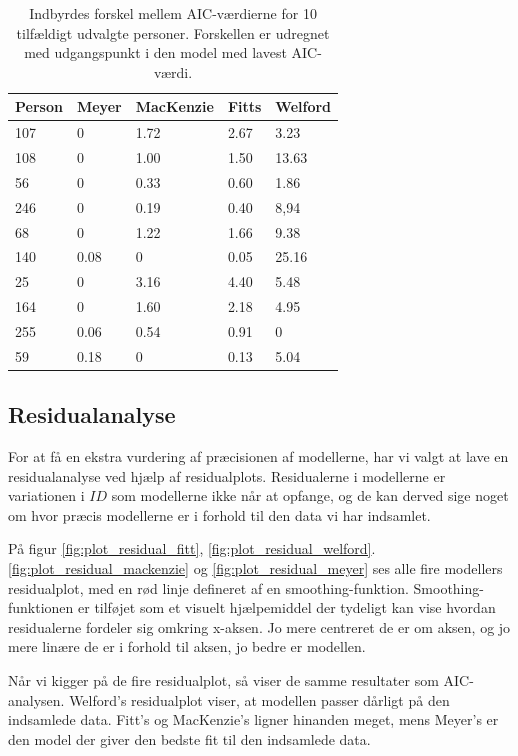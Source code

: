 \begin{table}[h]
\centering
\begin{tabular}{lllll}
Person & Meyer  & MacKenzie & Fitts  & Welford \\\hline
107    & 0      & 1.72      & 2.67   & 3.23    \\
108    & 0      & 1.00      & 1.50   & 13.63   \\
56     & 0      & 0.33      & 0.60   & 1.86    \\
246    & 0      & 0.19      & 0.40   & 8,94    \\
68     & 0      & 1.22      & 1.66   & 9.38    \\
140    & 0.08   & 0         & 0.05   & 25.16   \\
25     & 0      & 3.16      & 4.40   & 5.48    \\
164    & 0      & 1.60      & 2.18   & 4.95    \\
255    & 0.06   & 0.54      & 0.91   & 0       \\
59     & 0.18   & 0         & 0.13   & 5.04
\end{tabular}
\caption{Indbyrdes forskel mellem AIC-værdierne for 10 tilfældigt udvalgte personer. Forskellen er udregnet med udgangspunkt i den model med lavest AIC-værdi.}
\label{tab:table_analysis_aic3}
\end{table}

\subsection*{Residualanalyse}
For at få en ekstra vurdering af præcisionen af modellerne, har vi valgt at lave en residualanalyse ved hjælp af residualplots. Residualerne i modellerne er variationen i $ID$ som modellerne ikke når at opfange, og de kan derved sige noget om hvor præcis modellerne er i forhold til den data vi har indsamlet.

På figur \ref{fig:plot_residual_fitt}, \ref{fig:plot_residual_welford}. \ref{fig:plot_residual_mackenzie} og \ref{fig:plot_residual_meyer} ses alle fire modellers residualplot, med en rød linje defineret af en smoothing-funktion. Smoothing-funktionen er tilføjet som et visuelt hjælpemiddel der tydeligt kan vise hvordan residualerne fordeler sig omkring x-aksen. Jo mere centreret de er om aksen, og jo mere linære de er i forhold til aksen, jo bedre er modellen.

Når vi kigger på de fire residualplot, så viser de samme resultater som AIC-analysen. Welford's residualplot viser, at modellen passer dårligt på den indsamlede data. Fitt's og MacKenzie's ligner hinanden meget, mens Meyer's er den model der giver den bedste fit til den indsamlede data.

